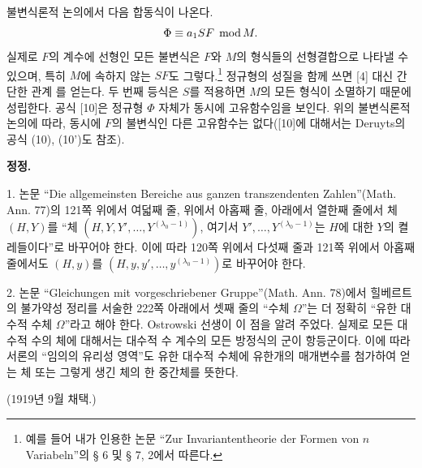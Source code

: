 불변식론적 논의에서 다음 합동식이 나온다.
\[
\Phi\equiv a_1SF\;\operatorname{mod} M.
\]
실제로 \(F\)의 계수에 선형인 모든 불변식은 \(F\)와 \(M\)의 형식들의 선형결합으로 나타낼 수 있으며, 특히 \(M\)에 속하지 않는 \(SF\)도 그렇다.\footnote{예를 들어 내가 인용한 논문 ``Zur Invariantentheorie der Formen von \(n\) Variabeln''의 § 6 및 § 7, 2에서 따른다.} 정규형의 성질을 함께 쓰면 [4] 대신 간단한 관계
를 얻는다. 두 번째 등식은 \(S\)를 적용하면 \(M\)의 모든 형식이 소멸하기 때문에 성립한다. 공식 [10]은 정규형 \(\Phi\) 자체가 동시에 고유함수임을 보인다. 위의 불변식론적 논의에 따라, 동시에 \(F\)의 불변식인 다른 고유함수는 없다([10]에 대해서는 Deruyts의 공식 (10), (10')도 참조).

\begin{center}
\textbf{정정.}
\end{center}

1. 논문 ``Die allgemeinsten Bereiche aus ganzen transzendenten Zahlen''(Math. Ann. 77)의 121쪽 위에서 여덟째 줄, 위에서 아홉째 줄, 아래에서 열한째 줄에서 체 \((H,Y)\)를 ``체 \((H,Y,Y',\ldots,Y^{(\lambda_0-1)})\), 여기서 \(Y',\ldots,Y^{(\lambda_0-1)}\)는 \(H\)에 대한 \(Y\)의 켤레들이다''로 바꾸어야 한다. 이에 따라 120쪽 위에서 다섯째 줄과 121쪽 위에서 아홉째 줄에서도 \((H,y)\)를 \((H,y,y',\ldots,y^{(\lambda_0-1)})\)로 바꾸어야 한다.

2. 논문 ``Gleichungen mit vorgeschriebener Gruppe''(Math. Ann. 78)에서 힐베르트의 불가약성 정리를 서술한 222쪽 아래에서 셋째 줄의 ``수체 \(\Omega\)''는 더 정확히 ``유한 대수적 수체 \(\Omega\)''라고 해야 한다. Ostrowski 선생이 이 점을 알려 주었다. 실제로 모든 대수적 수의 체에 대해서는 대수적 수 계수의 모든 방정식의 군이 항등군이다. 이에 따라 서론의 ``임의의 유리성 영역''도 유한 대수적 수체에 유한개의 매개변수를 첨가하여 얻는 체 또는 그렇게 생긴 체의 한 중간체를 뜻한다.

\begin{center}
(1919년 9월 채택.)
\end{center}

\clearpage
\setcounter{footnote}{0}
